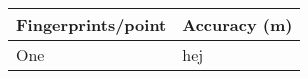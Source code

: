 \begin{tabular}{l|l}
\hline
Fingerprints/point	             &  Accuracy (m)                 \\ \hline
One	& hej
\end{tabular}
